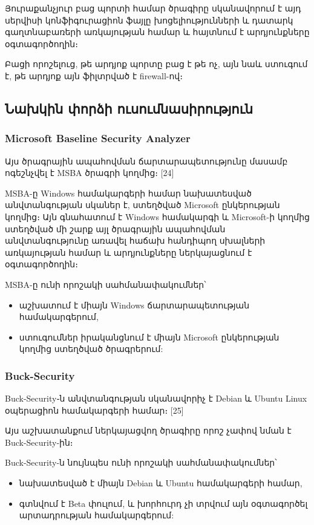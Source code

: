 \documentclass[a4paper,12pt]{article}
\begin{document}
\begin{sloppypar}
Յուրաքանչյուր բաց պորտի համար ծրագիրը սկանավորում է այդ սերվիսի
կոնֆիգուրացիոն ֆայլը խոցելիությունների և դատարկ գաղտնաբառերի
առկայության համար և հայտնում է արդյունքները օգտագործողին։

Բացի որոշելուց, թե արդյոք պորտը բաց է թե ոչ, այն նաև ստուգում է,
թե արդյոք այն ֆիլտրված է firewall-ով։


\subsection{Նախկին փորձի ուսումնասիրություն}


\subsubsection{Microsoft Baseline Security Analyzer}


Այս ծրագրային ապահովման ճարտարապետությունը մասամբ ոգեշնչվել է
MSBA ծրագրի կողմից։ [24]

MSBA-ը Windows համակարգերի համար նախատեսված անվտանգության սկաներ է,
ստեղծված Microsoft ընկերության կողմից։ Այն գնահատում է Windows
համակարգի և Microsoft-ի կողմից ստեղծված մի շարք այլ ծրագրային ապահովման
անվտանգությունը առավել հաճախ հանդիպող սխալների առկայության համար և արդյունքները 
ներկայացնում է օգտագործողին։

MSBA-ը ունի որոշակի սահմանափակումներ՝
\begin{itemize}
\item աշխատում է միայն Windows ճարտարապետության համակարգերում,
\item ստուգումներ իրականցնում է միայն Microsoft ընկերության
	կողմից ստեղծված ծրագրերում:
\end{itemize}


\subsubsection{Buck-Security}


Buck-Security֊ն անվտանգության սկանավորիչ է Debian և Ubuntu Linux
օպերացիոն համակարգերի համար։ [25]

Այս աշխատանքում ներկայացվող ծրագիրը որոշ չափով նման է Buck-Security-ին։

Buck-Security-ն նույնպես ունի որոշակի սահմանափակումներ՝
\begin{itemize}
\item նախատեսված է միայն Debian և Ubuntu համակարգերի համար,
\item գտնվում է Beta փուլում, և խորհուրդ չի տրվում այն օգտագործել
	արտադրության համակարգերում:
\end{itemize}



\end{sloppypar}
\end{document}
